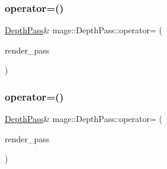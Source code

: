 \hypertarget{classmage_1_1_depth_pass_ac84074238d8ce69251fc2e6f294c5898}{}\label{classmage_1_1_depth_pass_ac84074238d8ce69251fc2e6f294c5898} 
\subsubsection{\texorpdfstring{operator=()}{operator=()}\hspace{0.1cm}{\footnotesize\ttfamily [1/2]}}
{\footnotesize\ttfamily \hyperlink{classmage_1_1_depth_pass}{Depth\+Pass}\& mage\+::\+Depth\+Pass\+::operator= (\begin{DoxyParamCaption}\item[{const \hyperlink{classmage_1_1_depth_pass}{Depth\+Pass} \&}]{render\+\_\+pass }\end{DoxyParamCaption})\hspace{0.3cm}{\ttfamily [delete]}}

\hypertarget{classmage_1_1_depth_pass_ab6a7d2abf0876f84591328d448ac1203}{}\label{classmage_1_1_depth_pass_ab6a7d2abf0876f84591328d448ac1203} 
\subsubsection{\texorpdfstring{operator=()}{operator=()}\hspace{0.1cm}{\footnotesize\ttfamily [2/2]}}
{\footnotesize\ttfamily \hyperlink{classmage_1_1_depth_pass}{Depth\+Pass}\& mage\+::\+Depth\+Pass\+::operator= (\begin{DoxyParamCaption}\item[{\hyperlink{classmage_1_1_depth_pass}{Depth\+Pass} \&\&}]{render\+\_\+pass }\end{DoxyParamCaption})\hspace{0.3cm}{\ttfamily [delete]}}

\hypertarget{classmage_1_1_depth_pass_a00a2eaabd0d0363cf58998a46688c490}{}\label{classmage_1_1_depth_pass_a00a2eaabd0d0363cf58998a46688c490} 

